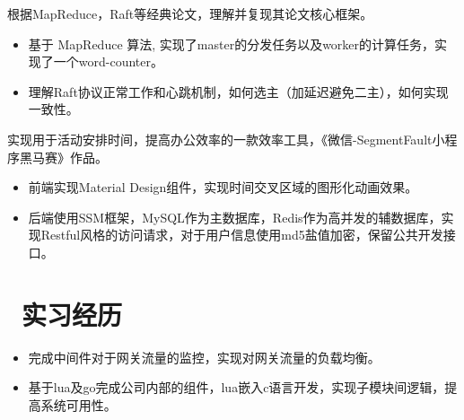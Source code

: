 \documentclass{resume}
\begin{document}
\vspace{-1.5ex}

\begin{onehalfspacing}
根据MapReduce，Raft等经典论文，理解并复现其论文核心框架。
\begin{itemize}
  \item 基于 MapReduce 算法, 实现了master的分发任务以及worker的计算任务，实现了一个word-counter。
  \item 理解Raft协议正常工作和心跳机制，如何选主（加延迟避免二主），如何实现一致性。
\end{itemize}
\end{onehalfspacing}

\vspace{-1.5ex}

\begin{onehalfspacing}
实现用于活动安排时间，提高办公效率的一款效率工具，《微信-SegmentFault小程序黑马赛》作品。
\begin{itemize}
  \item 前端实现Material Design组件，实现时间交叉区域的图形化动画效果。
  \item 后端使用SSM框架，MySQL作为主数据库，Redis作为高并发的辅数据库，实现Restful风格的访问请求，对于用户信息使用md5盐值加密，保留公共开发接口。
\end{itemize}
\end{onehalfspacing}


\vspace{-1ex}

\section{\faSitemap\ 实习经历}
\vspace{-0.5ex}
\begin{onehalfspacing}
\begin{itemize}
  \item 完成中间件对于网关流量的监控，实现对网关流量的负载均衡。
  \item 基于lua及go完成公司内部的组件，lua嵌入c语言开发，实现子模块间逻辑，提高系统可用性。
\end{itemize}
\end{onehalfspacing}
\end{document}

